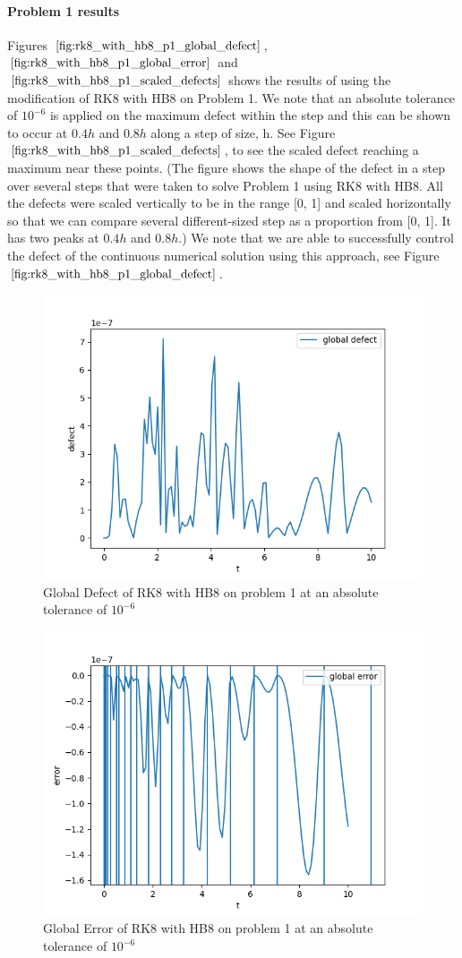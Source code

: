 \documentclass{article}
\begin{document}
\paragraph{Problem 1 results}
Figures $\ref{fig:rk8_with_hb8_p1_global_defect}$, $\ref{fig:rk8_with_hb8_p1_global_error}$ and $\ref{fig:rk8_with_hb8_p1_scaled_defects}$ shows the results of using the modification of RK8 with HB8 on Problem 1. We note that an absolute tolerance of $10^{-6}$ is applied on the maximum defect within the step and this can be shown to occur at $0.4h$ and $0.8h$ along a step of size, h. See Figure $\ref{fig:rk8_with_hb8_p1_scaled_defects}$, to see the scaled defect reaching a maximum near these points. (The figure shows the shape of the defect in a step over several steps that were taken to solve Problem 1 using RK8 with HB8. All the defects were scaled vertically to be in the range [0, 1] and scaled horizontally so that we can compare several different-sized step as a proportion from [0, 1]. It has two peaks at $0.4h$ and $0.8h$.) We note that we are able to successfully control the defect of the continuous numerical solution using this approach, see Figure $\ref{fig:rk8_with_hb8_p1_global_defect}$. 
 

\begin{figure}[H]
\centering
\includegraphics[width=0.7\linewidth]{./figures/rk8_with_hb8_p1_global_defect}
\caption{Global Defect of RK8 with HB8 on problem 1 at an absolute tolerance of $10^{-6}$}
\label{fig:rk8_with_hb8_p1_global_defect}
\end{figure}

\begin{figure}[H]
\centering
\includegraphics[width=0.7\linewidth]{./figures/rk8_with_hb8_p1_global_error}
\caption{Global Error of RK8 with HB8 on problem 1 at an absolute tolerance of $10^{-6}$}
\label{fig:rk8_with_hb8_p1_global_error}
\end{figure}
\end{document}
